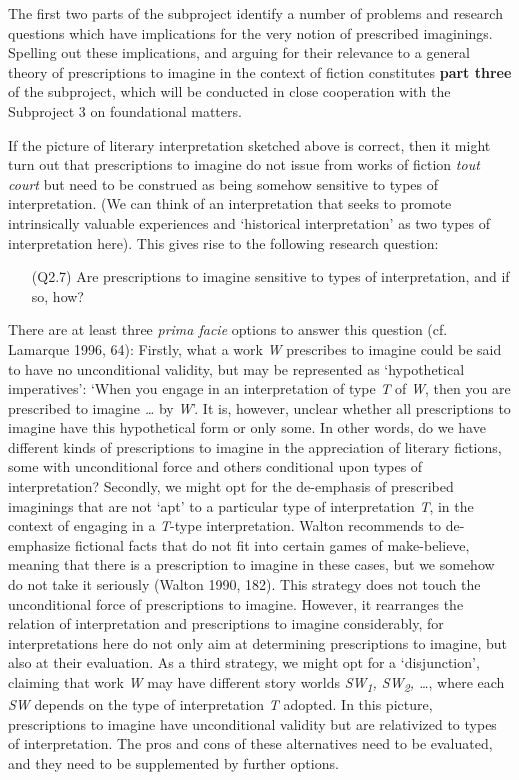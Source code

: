 \noindent The first two parts of the subproject identify a number of problems and research questions which have implications for the very notion of prescribed imaginings. Spelling out these implications, and arguing for their relevance to a general theory of prescriptions to imagine in the context of fiction constitutes \textbf{part three} of the subproject, which will be conducted in close cooperation with the Subproject 3 on foundational matters.

If the picture of literary interpretation sketched above is correct, then it might turn out that prescriptions to imagine do not issue from works of fiction \emph{tout court} but need to be construed as being somehow sensitive to types of interpretation. (We can think of an interpretation that seeks to promote intrinsically valuable experiences and `historical interpretation' as two types of interpretation here). This gives rise to the following research question:

\vspace{-.1cm}
\begin{itemize}[leftmargin=2cm]
\item[(Q2.7)] Are prescriptions to imagine sensitive to types of interpretation, and if so, how?
\end{itemize}
\vspace{-.1cm}

\noindent There are at least three \emph{prima facie} options to answer this question (cf. Lamarque 1996, 64): Firstly, what a work \emph{W} prescribes to imagine could be said to have no unconditional validity, but may be represented as `hypothetical imperatives': `When you engage in an interpretation of type \emph{T} of \emph{W}, then you are prescribed to imagine \emph{\ldots} by \emph{W}'. It is, however, unclear whether all prescriptions to imagine have this hypothetical form or only some. In other words, do we have different kinds of prescriptions to imagine in the appreciation of literary fictions, some with unconditional force and others conditional upon types of interpretation? Secondly, we might opt for the de-emphasis of prescribed imaginings that are not `apt' to a particular type of interpretation \emph{T}, in the context of engaging in a \emph{T}-type interpretation. Walton recommends to de-emphasize fictional facts that do not fit into certain games of make-believe, meaning that there is a prescription to imagine in these cases, but we somehow do not take it seriously (Walton 1990, 182). This strategy does not touch the unconditional force of prescriptions to imagine. However, it rearranges the relation of interpretation and prescriptions to imagine considerably, for interpretations here do not only aim at determining prescriptions to imagine, but also at their evaluation. As a third strategy, we might opt for a `disjunction', claiming that work \emph{W} may have different story worlds \emph{SW\textsubscript{1}, SW\textsubscript{2}, \ldots}, where each \emph{SW} depends on the type of interpretation \emph{T} adopted. In this picture, prescriptions to imagine have unconditional validity but are relativized to types of interpretation. The pros and cons of these alternatives need to be evaluated, and they need to be supplemented by further options. 

